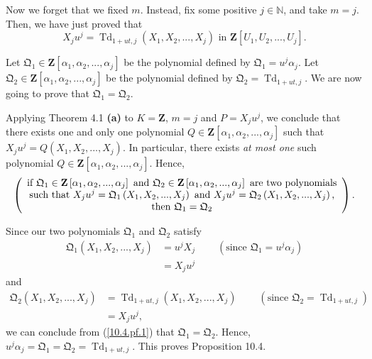 \documentclass[numbers=enddot,12pt,final,onecolumn,notitlepage]{scrartcl}%
\begin{document}
Now we forget that we fixed $m$. Instead, fix some positive $j\in\mathbb{N}$,
and take $m=j$. Then, we have just proved that
\[
X_{j}u^{j}=\operatorname*{Td}\nolimits_{1+ut,j}\left(  X_{1},X_{2}%
,...,X_{j}\right)  \text{ in }\mathbf{Z}\left[  U_{1},U_{2},...,U_{j}\right]
.
\]


Let $\mathfrak{Q}_{1}\in\mathbf{Z}\left[  \alpha_{1},\alpha_{2},...,\alpha
_{j}\right]  $ be the polynomial defined by $\mathfrak{Q}_{1}=u^{j}\alpha_{j}%
$. Let $\mathfrak{Q}_{2}\in\mathbf{Z}\left[  \alpha_{1},\alpha_{2}%
,...,\alpha_{j}\right]  $ be the polynomial defined by $\mathfrak{Q}%
_{2}=\operatorname*{Td}\nolimits_{1+ut,j}$. We are now going to prove that
$\mathfrak{Q}_{1}=\mathfrak{Q}_{2}$.

Applying Theorem 4.1 \textbf{(a)} to $K=\mathbf{Z}$, $m=j$ and $P=X_{j}u^{j}$,
we conclude that there exists one and only one polynomial $Q\in\mathbf{Z}%
\left[  \alpha_{1},\alpha_{2},...,\alpha_{j}\right]  $ such that $X_{j}%
u^{j}=Q\left(  X_{1},X_{2},...,X_{j}\right)  $. In particular, there exists
\textit{at most one} such polynomial $Q\in\mathbf{Z}\left[  \alpha_{1}%
,\alpha_{2},...,\alpha_{j}\right]  $. Hence,
\begin{equation}
\left(
\begin{array}
[c]{c}%
\text{if }\mathfrak{Q}_{1}\in\mathbf{Z}\left[  \alpha_{1},\alpha
_{2},...,\alpha_{j}\right]  \text{ and }\mathfrak{Q}_{2}\in\mathbf{Z}\left[
\alpha_{1},\alpha_{2},...,\alpha_{j}\right]  \text{ are two polynomials}\\
\text{such that }X_{j}u^{j}=\mathfrak{Q}_{1}\left(  X_{1},X_{2},...,X_{j}%
\right)  \text{ and }X_{j}u^{j}=\mathfrak{Q}_{2}\left(  X_{1},X_{2}%
,...,X_{j}\right)  \text{,}\\
\text{then }\mathfrak{Q}_{1}=\mathfrak{Q}_{2}%
\end{array}
\right)  . \label{10.4.pf.1}%
\end{equation}


Since our two polynomials $\mathfrak{Q}_{1}$ and $\mathfrak{Q}_{2}$ satisfy%
\begin{align*}
\mathfrak{Q}_{1}\left(  X_{1},X_{2},...,X_{j}\right)   &  =u^{j}%
X_{j}\ \ \ \ \ \ \ \ \ \ \left(  \text{since }\mathfrak{Q}_{1}=u^{j}\alpha
_{j}\right) \\
&  =X_{j}u^{j}%
\end{align*}
and%
\begin{align*}
\mathfrak{Q}_{2}\left(  X_{1},X_{2},...,X_{j}\right)   &  =\operatorname*{Td}%
\nolimits_{1+ut,j}\left(  X_{1},X_{2},...,X_{j}\right)
\ \ \ \ \ \ \ \ \ \ \left(  \text{since }\mathfrak{Q}_{2}=\operatorname*{Td}%
\nolimits_{1+ut,j}\right) \\
&  =X_{j}u^{j},
\end{align*}
we can conclude from (\ref{10.4.pf.1}) that $\mathfrak{Q}_{1}=\mathfrak{Q}%
_{2}$. Hence, $u^{j}\alpha_{j}=\mathfrak{Q}_{1}=\mathfrak{Q}_{2}%
=\operatorname*{Td}\nolimits_{1+ut,j}$. This proves Proposition 10.4.
\end{document}
